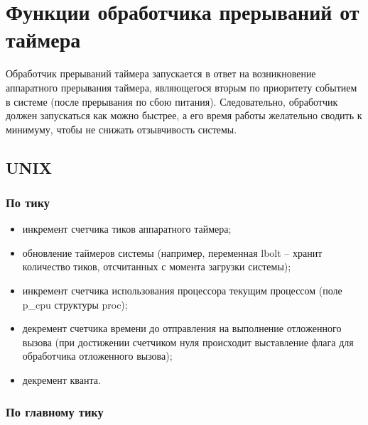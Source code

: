 \section{Функции обработчика прерываний от таймера}

Обработчик прерываний таймера запускается в ответ на возникновение аппаратного прерывания таймера, являющегося вторым по приоритету событием в системе (после прерывания по сбою питания). Следовательно, обработчик должен запускаться как можно быстрее, а его время работы желательно сводить к минимуму, чтобы не снижать отзывчивость системы.

\subsection{UNIX}

\subsubsection*{По тику}

\begin{itemize}
	\item инкремент счетчика тиков аппаратного таймера;
	\item обновление таймеров системы (например, переменная lbolt -- хранит количество тиков, отсчитанных с момента загрузки системы);
	\item инкремент счетчика использования процессора текущим процессом (поле p\_cpu структуры proc);
	\item декремент счетчика времени до отправления на выполнение отло­женного вызова (при достижении счетчиком нуля происходит выставление флага для обработчика отложенного вызова);
	\item декремент кванта.
\end{itemize}

\subsubsection*{По главному тику}

